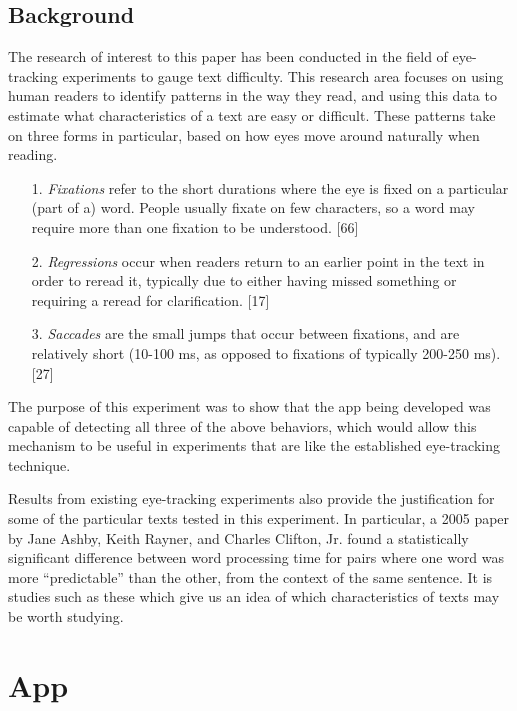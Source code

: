 \documentclass[11pt,letterpaper]{article}
\begin{document}
	\subsection{Background}
	
	The research of interest to this paper has been conducted in the field of eye-tracking experiments to gauge text difficulty. This research area focuses on using human readers to identify patterns in the way they read, and using this data to estimate what characteristics of a text are easy or difficult. These patterns take on three forms in particular, based on how eyes move around naturally when reading.
	
	
	\begin{itemize}[noitemsep, nolistsep]
		\item[1.] \textit{Fixations} refer to the short durations where the eye is fixed on a particular (part  of a) word. People usually fixate on few characters, so a word may require more than one fixation to be understood. [66]
		\item[2.] \textit{Regressions} occur when readers return to an earlier point in the text in order to reread it, typically due to either having missed something or requiring a reread for clarification. [17]
		\item[3.] \textit{Saccades} are the small jumps that occur between fixations, and are relatively short (10-100 ms, as opposed to fixations of typically 200-250 ms). [27]
	\end{itemize}
	
	The purpose of this experiment was to show that the app being developed was capable of detecting all three of the above behaviors, which would allow this mechanism to be useful in experiments that are like the established eye-tracking technique.
	
	Results from existing eye-tracking experiments also provide the justification for some of the particular texts tested in this experiment. In particular, a 2005 paper by Jane Ashby, Keith Rayner, and Charles Clifton, Jr. found a statistically significant difference between word processing time for pairs where one word was more ``predictable'' than the other, from the context of the same sentence. It is studies such as these which give us an idea of which characteristics of texts may be worth studying.
	
	\section{App}
	
\end{document}
